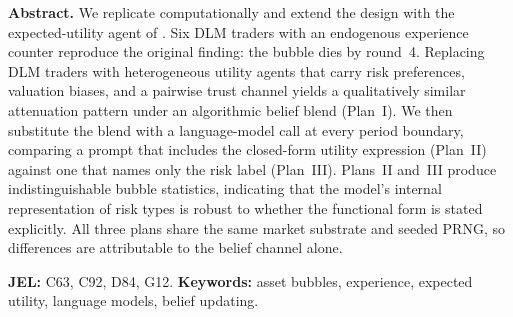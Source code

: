 \begin{center}
\begin{minipage}{0.88\textwidth}
\small
\noindent\textbf{Abstract.}
We replicate \citet{dufwenberg2005bubbles} computationally and extend
the design with the expected-utility agent of
\citet{lopezlira2025llm}.  Six DLM traders with an endogenous
experience counter reproduce the original finding: the bubble dies
by round~4.  Replacing DLM traders with heterogeneous utility agents
that carry risk preferences, valuation biases, and a pairwise trust
channel yields a qualitatively similar attenuation pattern under an
algorithmic belief blend (Plan~I).  We then substitute the blend with
a language-model call at every period boundary, comparing a prompt
that includes the closed-form utility expression (Plan~II) against one
that names only the risk label (Plan~III).  Plans~II and~III produce
indistinguishable bubble statistics, indicating that the model's
internal representation of risk types is robust to whether the
functional form is stated explicitly.  All three plans share the same
market substrate and seeded PRNG, so differences are attributable
to the belief channel alone.

\medskip
\noindent\textbf{JEL:} C63, C92, D84, G12.
\quad\textbf{Keywords:} asset bubbles, experience, expected utility,
language models, belief updating.
\end{minipage}
\end{center}
\bigskip
